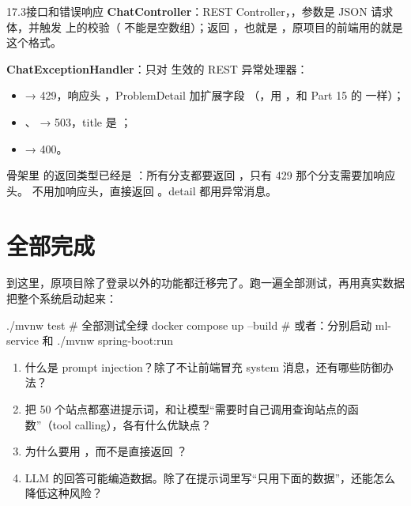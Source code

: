 \begin{task}{17.3\quad 接口和错误响应}
\textbf{ChatController}：REST Controller，，参数是 JSON 请求体，并触发  上的校验（ 不能是空数组）；返回 ，也就是 ，原项目的前端用的就是这个格式。

\textbf{ChatExceptionHandler}：只对  生效的 REST 异常处理器：
\begin{itemize}
  \item {} → 429，响应头 ，ProblemDetail 加扩展字段 （，用 ，和 Part 15 的  一样）；
  \item {}、 → 503，title 是 ；
  \item {} → 400。
\end{itemize}
骨架里  的返回类型已经是 ：所有分支都要返回 ，只有 429 那个分支需要加响应头。 不用加响应头，直接返回 。detail 都用异常消息。
\end{task}

\section{全部完成}

到这里，原项目除了登录以外的功能都迁移完了。跑一遍全部测试，再用真实数据把整个系统启动起来：

\begin{shell}
./mvnw test                              # 全部测试全绿
docker compose up --build                # 或者：分别启动 ml-service 和 ./mvnw spring-boot:run
\end{shell}

\begin{think}
\begin{enumerate}
  \item 什么是 prompt injection？除了不让前端冒充 system 消息，还有哪些防御办法？
  \item 把 50 个站点都塞进提示词，和让模型“需要时自己调用查询站点的函数”（tool calling），各有什么优缺点？
  \item 为什么要用 ，而不是直接返回 ？
  \item LLM 的回答可能编造数据。除了在提示词里写“只用下面的数据”，还能怎么降低这种风险？
\end{enumerate}
\end{think}
